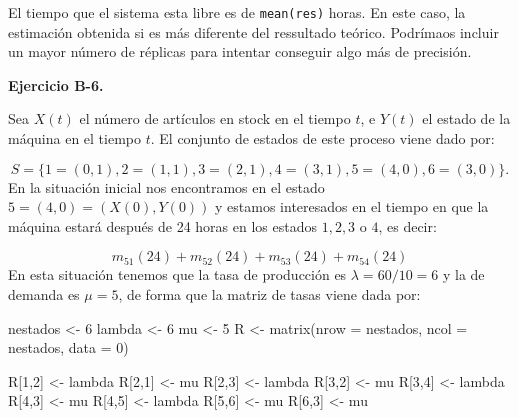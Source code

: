 \documentclass[
]{book}
\newenvironment{Shaded}{\begin{snugshade}}{\end{snugshade}}
\newcommand{\AttributeTok}[1]{\textcolor[rgb]{0.77,0.63,0.00}{#1}}
\newcommand{\DecValTok}[1]{\textcolor[rgb]{0.00,0.00,0.81}{#1}}
\newcommand{\FunctionTok}[1]{\textcolor[rgb]{0.00,0.00,0.00}{#1}}
\newcommand{\NormalTok}[1]{#1}
\newcommand{\OtherTok}[1]{\textcolor[rgb]{0.56,0.35,0.01}{#1}}
\theoremstyle{definition}
\theoremstyle{definition}
\theoremstyle{definition}
\theoremstyle{definition}
\theoremstyle{remark}
\begin{document}
El tiempo que el sistema esta libre es de \texttt{mean(res)} horas. En este caso, la estimación obtenida si es más diferente del ressultado teórico. Podrímaos incluir un mayor número de réplicas para intentar conseguir algo más de precisión.

\textbf{Ejercicio B-6.}

Sea \(X(t)\) el número de artículos en stock en el tiempo \(t\), e \(Y(t)\) el estado de la máquina en el tiempo \(t\). El conjunto de estados de este proceso viene dado por:

\[S = \{1 = (0, 1), 2 = (1, 1), 3 = (2, 1), 4 = (3, 1), 5 = (4, 0), 6 = (3, 0)\}.\] En la situación inicial nos encontramos en el estado \(5 = (4, 0) = (X(0), Y(0))\) y estamos interesados en el tiempo en que la máquina estará después de 24 horas en los estados \(1, 2, 3\) o \(4\), es decir:

\[m_{51}(24) + m_{52}(24) + m_{53}(24) + m_{54}(24)\] En esta situación tenemos que la tasa de producción es \(\lambda = 60/10 = 6\) y la de demanda es \(\mu = 5\), de forma que la matriz de tasas viene dada por:

\begin{Shaded}
\begin{Highlighting}[]
\NormalTok{nestados }\OtherTok{\textless{}{-}} \DecValTok{6}
\NormalTok{lambda }\OtherTok{\textless{}{-}} \DecValTok{6}
\NormalTok{mu }\OtherTok{\textless{}{-}} \DecValTok{5}
\NormalTok{R }\OtherTok{\textless{}{-}} \FunctionTok{matrix}\NormalTok{(}\AttributeTok{nrow =}\NormalTok{ nestados, }\AttributeTok{ncol =}\NormalTok{ nestados, }\AttributeTok{data =} \DecValTok{0}\NormalTok{)}

\NormalTok{R[}\DecValTok{1}\NormalTok{,}\DecValTok{2}\NormalTok{] }\OtherTok{\textless{}{-}}\NormalTok{ lambda }
\NormalTok{R[}\DecValTok{2}\NormalTok{,}\DecValTok{1}\NormalTok{] }\OtherTok{\textless{}{-}}\NormalTok{ mu}
\NormalTok{R[}\DecValTok{2}\NormalTok{,}\DecValTok{3}\NormalTok{] }\OtherTok{\textless{}{-}}\NormalTok{ lambda }
\NormalTok{R[}\DecValTok{3}\NormalTok{,}\DecValTok{2}\NormalTok{] }\OtherTok{\textless{}{-}}\NormalTok{ mu}
\NormalTok{R[}\DecValTok{3}\NormalTok{,}\DecValTok{4}\NormalTok{] }\OtherTok{\textless{}{-}}\NormalTok{ lambda}
\NormalTok{R[}\DecValTok{4}\NormalTok{,}\DecValTok{3}\NormalTok{] }\OtherTok{\textless{}{-}}\NormalTok{ mu}
\NormalTok{R[}\DecValTok{4}\NormalTok{,}\DecValTok{5}\NormalTok{] }\OtherTok{\textless{}{-}}\NormalTok{ lambda}
\NormalTok{R[}\DecValTok{5}\NormalTok{,}\DecValTok{6}\NormalTok{] }\OtherTok{\textless{}{-}}\NormalTok{ mu}
\NormalTok{R[}\DecValTok{6}\NormalTok{,}\DecValTok{3}\NormalTok{] }\OtherTok{\textless{}{-}}\NormalTok{ mu}
\end{Highlighting}
\end{Shaded}
\end{document}
